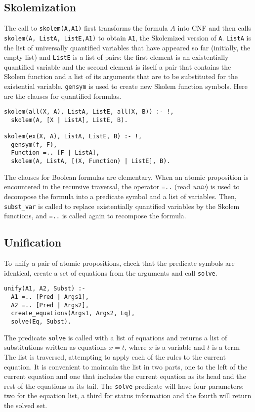 \documentclass[11pt]{article}
\newcommand*{\p}[1]{\textup{\texttt{#1}}}
\begin{document}
\subsection{Skolemization}\label{s.skolem}

The call to \p{skolem(A,A1)} first transforms the formula $A$ into CNF
and then calls \p{skolem(A, ListA, ListE,A1)} to obtain \p{A1}, the
Skolemized version of \p{A}. \p{ListA} is the list of universally
quantified variables that have appeared so far (initially, the empty
list) and \p{ListE} is a list of pairs: the first element is an
existentially quantified variable and the second element is itself a
pair that contains the Skolem function and a list of its arguments that
are to be substituted for the existential variable. \p{gensym} is used
to create new Skolem function symbols. Here are the clauses for
quantified formulas.

\begin{verbatim}
skolem(all(X, A), ListA, ListE, all(X, B)) :- !,
  skolem(A, [X | ListA], ListE, B).

skolem(ex(X, A), ListA, ListE, B) :- !,
  gensym(f, F),
  Function =.. [F | ListA],    
  skolem(A, ListA, [(X, Function) | ListE], B).
\end{verbatim}

The clauses for Boolean formulas are elementary. When an atomic
proposition is encountered in the recursive traversal,
the operator \p{=..} (read \emph{univ}) is used to decompose the formula
into a predicate symbol and a list of variables. Then, \p{subst\_var} is
called to replace existentially quantified variables by the Skolem
functions, and \p{=..} is called again to recompose the formula.




\subsection{Unification}\label{s.unif}

To unify a pair of atomic propositions, check that the predicate
symbols are identical, create a set of equations from the arguments and
call \p{solve}.

\begin{verbatim}
unify(A1, A2, Subst) :-
  A1 =.. [Pred | Args1],
  A2 =.. [Pred | Args2],
  create_equations(Args1, Args2, Eq),
  solve(Eq, Subst).
\end{verbatim}

The predicate \p{solve} is called with a list of equations and returns a
list of substitutions written as equations $x=t$, where $x$ is a
variable and $t$ is a term. The list is traversed, attempting to apply
each of the rules to the current equation. It is convenient to maintain
the list in two parts, one to the left of the current equation and one
that includes the current equation as its head and the rest of the
equations as its tail. The \p{solve} predicate will have four
parameters: two for the equation list, a third for status information
and the fourth will return the solved set.
\end{document}
